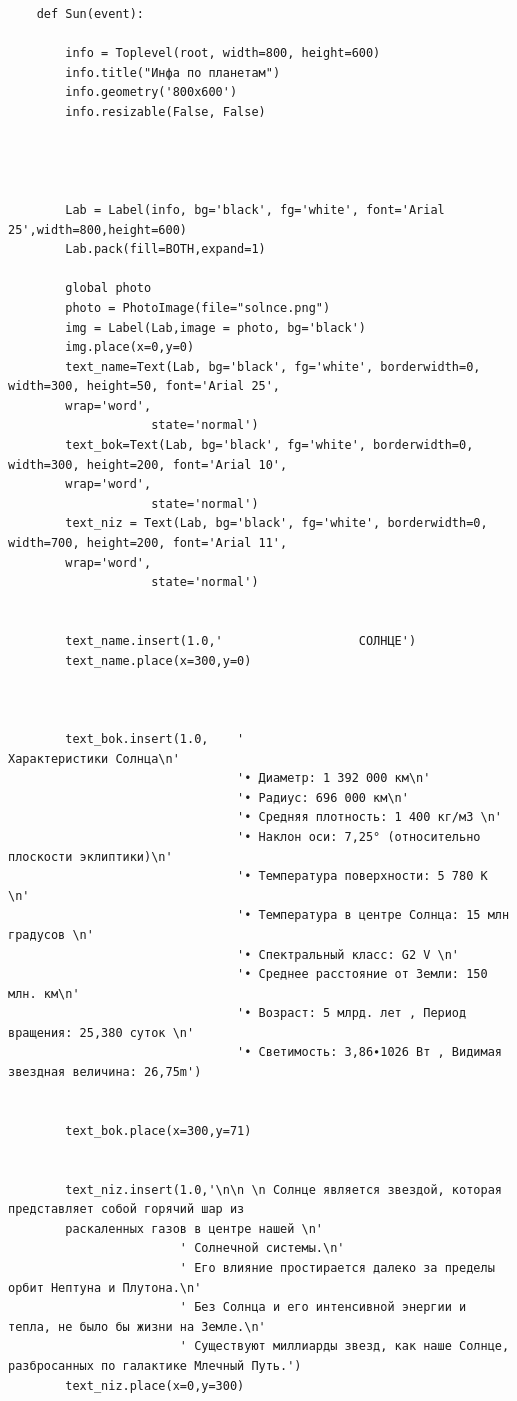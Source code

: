 \documentclass[11pt,a4paper]{report}
\begin{document}
\begin{verbatim}
    def Sun(event):
        
        info = Toplevel(root, width=800, height=600)
        info.title("Инфа по планетам")
        info.geometry('800x600')
        info.resizable(False, False)  
        
        
        
    
        Lab = Label(info, bg='black', fg='white', font='Arial 25',width=800,height=600)  
        Lab.pack(fill=BOTH,expand=1)
        
        global photo
        photo = PhotoImage(file="solnce.png")
        img = Label(Lab,image = photo, bg='black')
        img.place(x=0,y=0)
        text_name=Text(Lab, bg='black', fg='white', borderwidth=0, width=300, height=50, font='Arial 25', 
        wrap='word',
                    state='normal')  
        text_bok=Text(Lab, bg='black', fg='white', borderwidth=0, width=300, height=200, font='Arial 10', 
        wrap='word',
                    state='normal')  
        text_niz = Text(Lab, bg='black', fg='white', borderwidth=0, width=700, height=200, font='Arial 11', 
        wrap='word',
                    state='normal')  
    
       
        text_name.insert(1.0,'                   СОЛНЦЕ')
        text_name.place(x=300,y=0)
        
        
        
        text_bok.insert(1.0,    '                                           Характеристики Солнца\n' 
                                '• Диаметр: 1 392 000 км\n' 
                                '• Радиус: 696 000 км\n' 
                                '• Средняя плотность: 1 400 кг/м3 \n'
                                '• Наклон оси: 7,25° (относительно плоскости эклиптики)\n' 
                                '• Температура поверхности: 5 780 К \n'
                                '• Температура в центре Солнца: 15 млн градусов \n'
                                '• Спектральный класс: G2 V \n'
                                '• Среднее расстояние от Земли: 150 млн. км\n' 
                                '• Возраст: 5 млрд. лет , Период вращения: 25,380 суток \n'
                                '• Светимость: 3,86∙1026 Вт , Видимая звездная величина: 26,75m')
        
        
        text_bok.place(x=300,y=71)        
        
        
        text_niz.insert(1.0,'\n\n \n Солнце является звездой, которая представляет собой горячий шар из 
        раскаленных газов в центре нашей \n'
                        ' Солнечной системы.\n' 
                        ' Его влияние простирается далеко за пределы орбит Нептуна и Плутона.\n' 
                        ' Без Солнца и его интенсивной энергии и тепла, не было бы жизни на Земле.\n'
                        ' Существуют миллиарды звезд, как наше Солнце, разбросанных по галактике Млечный Путь.')
        text_niz.place(x=0,y=300)
        

\end{verbatim}
\end{document}
